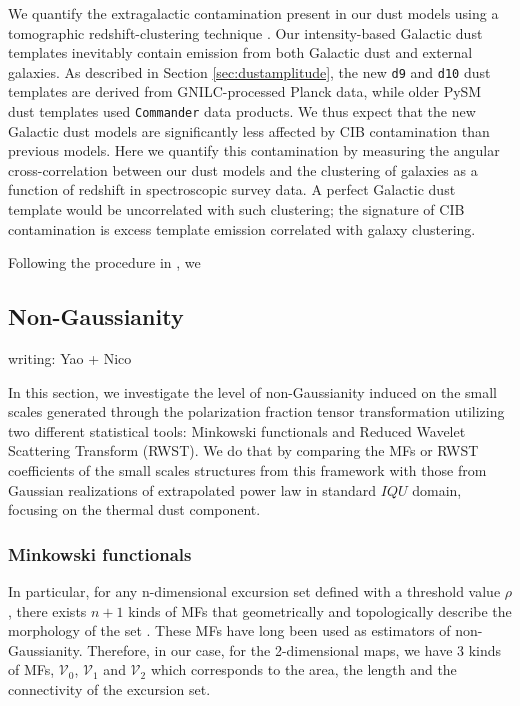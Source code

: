 \documentclass[twocolumn]{aastex631}
\begin{document}
We quantify the extragalactic contamination present in our dust models using a tomographic redshift-clustering technique \citep{Schmidt:2015, Chiang:2019}. Our intensity-based Galactic dust templates inevitably contain emission from both Galactic dust and external galaxies. As described in Section \ref{sec:dustamplitude}, the new \texttt{d9} and \texttt{d10} dust templates are derived from GNILC-processed Planck data, while older PySM dust templates used \texttt{Commander} data products. We thus expect that the new Galactic dust models are significantly less affected by CIB contamination than previous models. Here we quantify this contamination by measuring the angular cross-correlation between our dust models and the clustering of galaxies as a function of redshift in spectroscopic survey data. A perfect Galactic dust template would be uncorrelated with such clustering; the signature of CIB contamination is excess template emission correlated with galaxy clustering. 

Following the procedure in \citet{Chiang:2019}, we 


\subsection{Non-Gaussianity} \label{sec:nongaussianity}
writing: Yao + Nico

In this section, we investigate the level of non-Gaussianity induced on the small scales generated through the polarization fraction tensor transformation utilizing two different statistical tools: Minkowski functionals and Reduced Wavelet Scattering Transform (RWST). We do that by comparing the MFs or RWST coefficients of the small scales structures from this framework with those from Gaussian realizations of extrapolated power law in standard $IQU$ domain, focusing on the thermal dust component.

\subsubsection{Minkowski functionals}
In particular, for any n-dimensional excursion set defined with a threshold value $\rho$, there exists $n+1$ kinds of MFs that geometrically and topologically describe the morphology of the set \citep{}. These MFs have long been used as estimators of non-Gaussianity. Therefore, in our case, for the 2-dimensional maps, we have 3 kinds of MFs, $\mathcal{V}_0$, $\mathcal{V}_1$ and $\mathcal{V}_2$ which corresponds to the area, the length and the connectivity of the excursion set.
\end{document}
